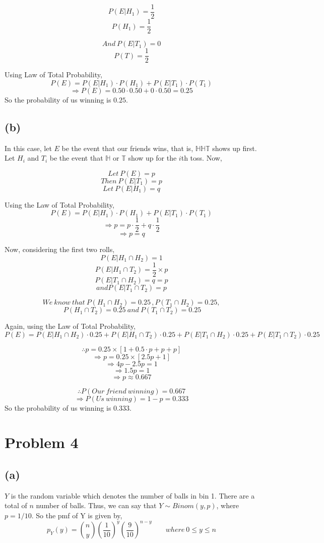 \documentclass{article}
\begin{document}
			$$ P(E|H_1) = \frac{1}{2}$$
			$$ P(H_1) = \frac{1}{2}$$

			$$ And\ P(E|T_1) = 0 $$
			$$ P(T) = \frac{1}{2} $$

			Using Law of Total Probability,
			$$ P(E) = P(E|H_1) \cdot P(H_1) + P(E|T_1) \cdot P( T_1) $$
			$$ \Rightarrow P(E) = 0.50 \cdot 0.50 + 0 \cdot 0.50 = 0.25 $$
			So the probability of us winning is $0.25$. 

		\subsection*{(b)}
			In this case, let $E$ be the event that our friends wins, that is, $\mathbb{HHT}$ shows up first.  Let $H_i$ and $T_i$ be the event that $\mathbb{H}$ or $\mathbb{T}$ show up for the $i$th toss. Now, 

			$$Let\ P(E)=p$$
			$$ Then\ P(E|T_1)=p $$
			$$ Let\ P(E|H_1) = q $$

			Using the Law of Total Probability,
			$$ P(E) = P(E|H_1) \cdot P(H_1) + P(E|T_1) \cdot P( T_1)  $$
			$$ \Rightarrow p = p \cdot \frac{1}{2} + q \cdot \frac{1}{2} $$
			$$ \Rightarrow p = q $$

			Now, considering the first two rolls,
			$$ P(E| H_1 \cap H_2 ) = 1 $$
			$$ P(E| H_1 \cap T_2 ) = \frac{1}{2} \times p $$
			$$ P(E| T_1 \cap H_2 ) = q = p  $$
			$$ and P(E| T_1 \cap T_2 ) = p $$

			$$ We\ know\ that\ P(H_1 \cap H_2 ) = 0.25 \, , P(T_1 \cap H_2 ) = 0.25, $$
			$$  \ P(H_1 \cap T_2 ) = 0.25 \ and\ P(T_1 \cap T_2 )=0.25$$

			Again, using the Law of Total Probability,
			$$ P(E) =  P(E| H_1 \cap H_2 )\cdot 0.25 +  P(E| H_1 \cap T_2 )\cdot 0.25 +  P(E| T_1 \cap H_2 )\cdot 0.25 + P(E| T_1 \cap T_2 )\cdot 0.25 $$

			$$ \therefore p = 0.25 \times \left[ 1 + 0.5 \cdot p + p +p \right] $$
			$$ \Rightarrow p = 0.25\times [2.5p + 1] $$
			$$ \Rightarrow 4p - 2.5p = 1 $$
			$$ \Rightarrow 1.5p = 1 $$
			$$ \Rightarrow p \approx 0.667 $$

			$$ \therefore P(Our\ friend\ winning) = 0.667 $$
			$$ \Rightarrow P(Us\ winning) = 1 - p = 0.333 $$
			So the probability of us winning is $0.333$. 

	\section*{Problem 4}
		\subsection*{(a)}
		$Y$ is the random variable which denotes the number of balls in bin 1. There are a total of $n$ number of balls. Thus, we can say that $Y\sim Binom(y,p)$, where $p=1/10$.
		So the pmf of Y is given by,
		$$ p_Y(y) = {n \choose y} \left( \frac{1}{10} \right)^y \left( \frac{9}{10} \right)^{n-y} \; \; \; \; \; \; \; where\ 0\leq y \leq n $$
\end{document}
